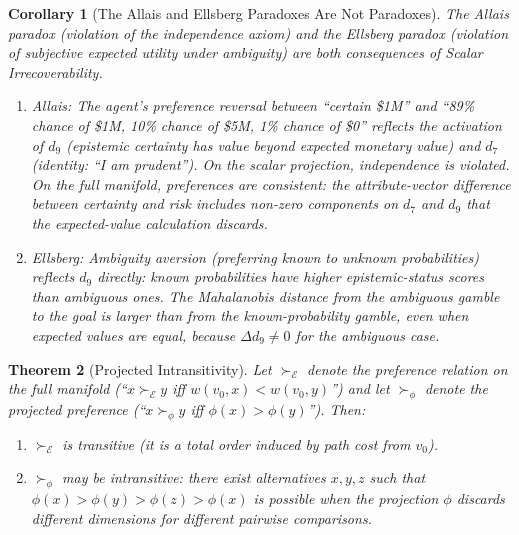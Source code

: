 \documentclass[12pt]{article}
\newtheorem{theorem}{Theorem}[section]
\newtheorem{corollary}[theorem]{Corollary}
\theoremstyle{definition}
\theoremstyle{remark}
\newcommand{\E}{\mathcal{E}}               %
\begin{document}
\begin{corollary}[The Allais and Ellsberg Paradoxes Are Not Paradoxes]
\label{cor:allais}
The Allais paradox \cite{allais1953} (violation of the independence axiom) and the Ellsberg paradox \cite{ellsberg1961} (violation of subjective expected utility under ambiguity) are both consequences of Scalar Irrecoverability.
\begin{enumerate}
    \item \emph{Allais:} The agent's preference reversal between ``certain \$1M'' and ``89\% chance of \$1M, 10\% chance of \$5M, 1\% chance of \$0'' reflects the activation of $d_9$ (epistemic certainty has value beyond expected monetary value) and $d_7$ (identity: ``I am prudent'').  On the scalar projection, independence is violated.  On the full manifold, preferences are consistent: the attribute-vector difference between certainty and risk includes non-zero components on $d_7$ and $d_9$ that the expected-value calculation discards.
    \item \emph{Ellsberg:} Ambiguity aversion (preferring known to unknown probabilities) reflects $d_9$ directly: known probabilities have higher epistemic-status scores than ambiguous ones.  The Mahalanobis distance from the ambiguous gamble to the goal is larger than from the known-probability gamble, even when expected values are equal, because $\Delta d_9 \neq 0$ for the ambiguous case.
\end{enumerate}
\end{corollary}

\begin{theorem}[Projected Intransitivity]
\label{thm:intransitivity}
Let $\succ_{\E}$ denote the preference relation on the full manifold (``$x \succ_{\E} y$ iff $w(v_0, x) < w(v_0, y)$'') and let $\succ_\phi$ denote the projected preference (``$x \succ_\phi y$ iff $\phi(x) > \phi(y)$'').  Then:
\begin{enumerate}
    \item $\succ_{\E}$ is transitive (it is a total order induced by path cost from $v_0$).
    \item $\succ_\phi$ may be intransitive: there exist alternatives $x, y, z$ such that $\phi(x) > \phi(y) > \phi(z) > \phi(x)$ is possible when the projection $\phi$ discards different dimensions for different pairwise comparisons.
\end{enumerate}
\end{theorem}
\end{document}
